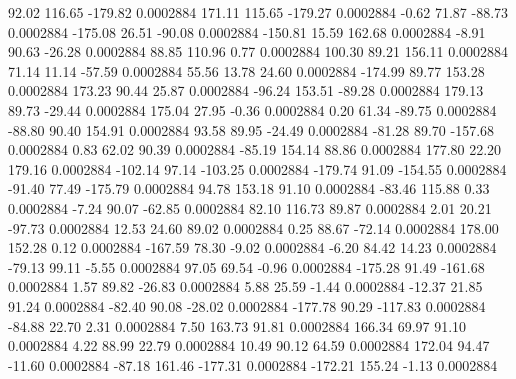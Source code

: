        92.02      116.65     -179.82     0.0002884
      171.11      115.65     -179.27     0.0002884
       -0.62       71.87      -88.73     0.0002884
     -175.08       26.51      -90.08     0.0002884
     -150.81       15.59      162.68     0.0002884
       -8.91       90.63      -26.28     0.0002884
       88.85      110.96        0.77     0.0002884
      100.30       89.21      156.11     0.0002884
       71.14       11.14      -57.59     0.0002884
       55.56       13.78       24.60     0.0002884
     -174.99       89.77      153.28     0.0002884
      173.23       90.44       25.87     0.0002884
      -96.24      153.51      -89.28     0.0002884
      179.13       89.73      -29.44     0.0002884
      175.04       27.95       -0.36     0.0002884
        0.20       61.34      -89.75     0.0002884
      -88.80       90.40      154.91     0.0002884
       93.58       89.95      -24.49     0.0002884
      -81.28       89.70     -157.68     0.0002884
        0.83       62.02       90.39     0.0002884
      -85.19      154.14       88.86     0.0002884
      177.80       22.20      179.16     0.0002884
     -102.14       97.14     -103.25     0.0002884
     -179.74       91.09     -154.55     0.0002884
      -91.40       77.49     -175.79     0.0002884
       94.78      153.18       91.10     0.0002884
      -83.46      115.88        0.33     0.0002884
       -7.24       90.07      -62.85     0.0002884
       82.10      116.73       89.87     0.0002884
        2.01       20.21      -97.73     0.0002884
       12.53       24.60       89.02     0.0002884
        0.25       88.67      -72.14     0.0002884
      178.00      152.28        0.12     0.0002884
     -167.59       78.30       -9.02     0.0002884
       -6.20       84.42       14.23     0.0002884
      -79.13       99.11       -5.55     0.0002884
       97.05       69.54       -0.96     0.0002884
     -175.28       91.49     -161.68     0.0002884
        1.57       89.82      -26.83     0.0002884
        5.88       25.59       -1.44     0.0002884
      -12.37       21.85       91.24     0.0002884
      -82.40       90.08      -28.02     0.0002884
     -177.78       90.29     -117.83     0.0002884
      -84.88       22.70        2.31     0.0002884
        7.50      163.73       91.81     0.0002884
      166.34       69.97       91.10     0.0002884
        4.22       88.99       22.79     0.0002884
       10.49       90.12       64.59     0.0002884
      172.04       94.47      -11.60     0.0002884
      -87.18      161.46     -177.31     0.0002884
     -172.21      155.24       -1.13     0.0002884

